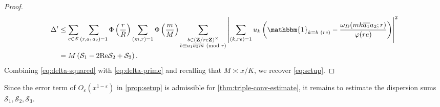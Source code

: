 \documentclass[reqno,11pt]{amsart}
\theoremstyle{definition}
\theoremstyle{remark}
\numberwithin{equation}{section}
\newcommand{\Z}{\mathbf{Z}}
\newcommand{\msE}{\mathscr{E}}
\newcommand{\mS}{\mathcal{S}}
\newcommand{\one}{\mathbbm{1}}
\renewcommand{\Re}{\textnormal{Re}}
\newcommand{\eps}{\varepsilon}
\renewcommand{\bar}{\overline}
\renewcommand{\pmod}[1]{\ (\textnormal{mod } #1)}
\begin{document}
\begin{proof}
\begin{equation}
\begin{aligned}
    \Delta' &\le \sum_{e \in \msE} \sum_{\substack{(r,a_1a_2)=1}} \Phi\left(\frac{r}{R}\right) \sum_{\substack{(m,r)=1}} \Phi\left(\frac{m}{M}\right) \sum_{\substack{b \in (\Z/re\Z)^\times \\ b \equiv a_1\bar{a_2 m} \pmod{r}}} \left\vert \sum_{(k,re)=1} u_k \left(\one_{k \equiv b\ (re)} - \frac{\omega_D(mk \bar{a_1}a_2; r)}{\varphi(re)} \right)\right\vert^2
    \\
    &= M \left(\mS_1 - 2\Re \mS_2 + \mS_3\right).
\end{aligned}
\end{equation}
Combining \cref{eq:delta-squared} with \cref{eq:delta-prime} and recalling that $M \asymp x/K$, we recover \cref{eq:setup}.
\end{proof}

Since the error term of $O_\eps(x^{1-\eps})$ in \cref{prop:setup} is admissible for \cref{thm:triple-conv-estimate}, it remains to estimate the dispersion sums $\mS_1, \mS_2, \mS_3$.
\end{document}
